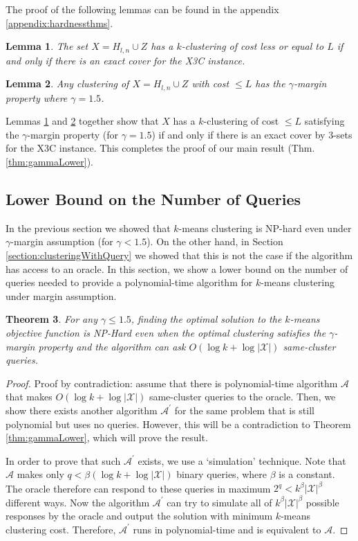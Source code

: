 \documentclass{article}
\newcommand{\mc}{\mathcal}
\newtheorem{theorem}{Theorem}
\newtheorem{lemma}[theorem]{Lemma}
\begin{document}
The proof of the following lemmas can be found in the appendix \ref{appendix:hardnessthms}.

\begin{lemma}
\label{lemma:kmeansEquivalenceX3C}
The set $X = H_{l,n} \cup Z$ has a $k$-clustering of cost less or equal to $L$ if and only if there is an exact cover for the X3C instance.
\end{lemma}

\begin{lemma}
\label{lemma:gammaLower}
Any clustering of $X = H_{l,n} \cup Z$ with cost $\le L$ has the $\gamma$-margin property where $\gamma = 1.5$.
\end{lemma}

Lemmas \ref{lemma:kmeansEquivalenceX3C} and \ref{lemma:gammaLower} together show that $X$ has a $k$-clustering of cost $\le L$ satisfying the $\gamma$-margin property (for $\gamma = 1.5$) if and only if there is an exact cover by $3$-sets for the X3C instance. This completes the proof of our main result (Thm. \ref{thm:gammaLower}). 

\subsection{Lower Bound on the Number of Queries}

In the previous section we showed that $k$-means clustering is NP-hard even under $\gamma$-margin assumption (for $\gamma < 1.5$). On the other hand, in Section \ref{section:clusteringWithQuery} we showed that this is not the case if the algorithm has access to an oracle. In this section, we show a lower bound on the number of queries needed to provide a polynomial-time algorithm for $k$-means clustering under margin assumption.

\begin{theorem}
\label{thm:queryLower}
For any $\gamma \le 1.5$, finding the optimal solution to the $k$-means objective function is NP-Hard even when the optimal clustering satisfies the $\gamma$-margin property and the algorithm can ask $O(\log k + \log |\mc X|)$ same-cluster queries.
\end{theorem}
\begin{proof}
Proof by contradiction: assume that there is polynomial-time algorithm $\mc A$ that makes $O(\log k + \log |\mc X|)$ same-cluster queries to the oracle. Then, we show there exists another algorithm $\mc A^\prime$ for the same problem that is still polynomial but uses no queries. However, this will be a contradiction to Theorem \ref{thm:gammaLower}, which will prove the result.

In order to prove that such $\mc A^\prime$ exists, we use a `simulation' technique. Note that $\mc A$ makes only $q<\beta(\log k + \log |\mc X|)$ binary queries, where $\beta$ is a constant. The oracle therefore can respond to these queries in maximum $2^{q} < k^\beta|\mc X|^\beta$ different ways. Now the algorithm $\mc A^\prime$ can try to simulate all of $k^\beta|\mc X|^\beta$ possible responses by the oracle and output the solution with minimum $k$-means clustering cost. Therefore, $\mc A^\prime$ runs in polynomial-time and is equivalent to $\mc A$.
\end{proof}
\end{document}
